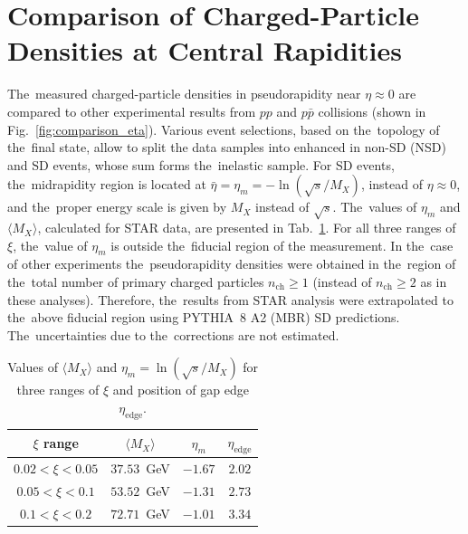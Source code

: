\section{Comparison of Charged-Particle Densities at Central Rapidities}\label{chapter:discussion}
\label{sec:comparison_eta}
The~measured charged-particle densities in pseudorapidity near  $\eta\approx 0$ are compared to other experimental results from $pp$ and $p\bar{p}$ collisions (shown in Fig.~\ref{fig:comparison_eta}). Various event selections, based on the~topology of the~final state, allow to split the data samples into enhanced in non-\ac{SD} (NSD)  and  \ac{SD} events, whose  sum forms the~inelastic sample. For \ac{SD} events, 
the~midrapidity region  is  located at $\bar{\eta}=\eta_{m}=-\ln(\sqrt{s}/M_{X})$, instead of $\eta\approx 0$, and the~proper energy scale is given by $M_X$ instead of $\sqrt{s}$.
The~values of $\eta_{m}$ and $\langle M_{X}\rangle$, calculated  for STAR data, are presented in Tab.~\ref{tab:etabarComparison}. 
For all three  ranges of $\xi$, the~value of $\eta_{m}$ is outside the~fiducial region of the measurement. In the~case of other experiments  the~pseudorapidity densities were obtained  in the~region of the~total number of primary charged particles $n_\textrm{ch}\geq1$  (instead of $n_\textrm{ch}\geq2$ as in these analyses).   Therefore, the~results from STAR  analysis were extrapolated  to the~above fiducial region using PYTHIA~8 A2 (MBR) \ac{SD}   predictions. The~uncertainties due to the~corrections are not estimated.

\begin{table}[h!]
	\centering
	\begin{tabular}{ |c|c|c|c| }
		\hline
		$\xi$ range &  $\langle M_X \rangle$ & $\eta_m$ & $\eta_\textrm{edge}$ \\
		\hline
		$0.02<\xi<0.05$ & $37.53$~GeV & $-1.67$ & $2.02$\\
		$0.05<\xi<0.1$ & $53.52$~GeV &  $-1.31$ & $2.73$\\
		$0.1<\xi<0.2$ & $72.71$~GeV & $-1.01$ & $3.34$\\
		\hline
	\end{tabular}
	\caption{Values of $\langle M_X \rangle$ and $\eta_m=\ln(\sqrt{s}/M_X)$ for three ranges of $\xi$ and position of gap edge $\eta_\textrm{edge}$.}
	\label{tab:etabarComparison}
	\vspace{0.8cm}
\end{table}


